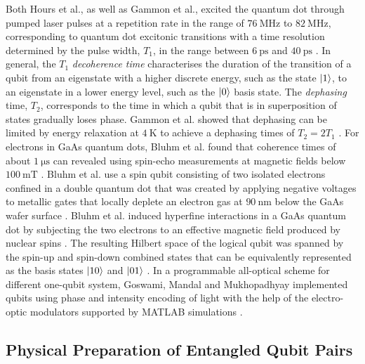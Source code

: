 Both Hours et al., as well as Gammon et al., excited the quantum dot through pumped laser pulses at a repetition rate in the range of $\SI{76}{\mega\hertz}$ to $\SI{82}{\mega\hertz}$, corresponding to quantum dot excitonic transitions with a time resolution determined by the pulse width, $T_1$, in the range between $\SI{6}{\pico\second}$ and $\SI{40}{\pico\second}$ \cite{hours2003single, stievater2001rabi}. In general, the $T_1$ \textit{decoherence time} characterises the duration of the transition of a qubit from an eigenstate with a higher discrete energy, such as the state $\ket{1}$, to an eigenstate in a lower energy level, such as the $\ket{0}$ basis state. The \textit{dephasing} time, $T_2$, corresponds to the time in which a qubit that is in superposition of states gradually loses phase. Gammon et al. showed that dephasing can be limited by energy relaxation at $\SI{4}{\kelvin}$ to achieve a dephasing times of $T_2 = 2T_1$ \cite{hours2003single}. For electrons in GaAs quantum dots, Bluhm et al. found that coherence times of about $\SI{1}{\micro\second}$ can revealed using spin-echo measurements at magnetic fields below $\SI{100}{\milli\tesla}$ \cite{bluhm2011dephasing}. Bluhm et al. use a spin qubit consisting of two isolated electrons confined in a double quantum dot that was created by applying negative voltages to metallic gates that locally deplete an electron gas at $\SI{90}{\nano\meter}$ below the GaAs wafer surface \cite{bluhm2011dephasing}. Bluhm et al. induced hyperfine interactions in a GaAs quantum dot by subjecting the two electrons to an effective magnetic field produced by nuclear spins \cite{bluhm2011dephasing}. The resulting Hilbert space of the logical qubit was spanned by the spin-up and spin-down combined states that can be equivalently represented as the basis states $\ket{10}$ and $\ket{01}$ \cite{bluhm2011dephasing}. In a programmable all-optical scheme for different one-qubit system, Goswami, Mandal and Mukhopadhyay implemented qubits using phase and intensity encoding of light with the help of the electro-optic modulators supported by MATLAB simulations \cite{mandal2023implementation}.

\subsection{Physical Preparation of Entangled Qubit Pairs}

